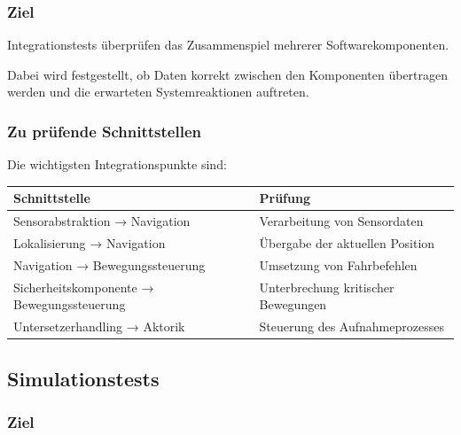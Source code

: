 \subsubsection{Ziel}\label{ziel-1}

Integrationstests überprüfen das Zusammenspiel mehrerer
Softwarekomponenten.

Dabei wird festgestellt, ob Daten korrekt zwischen den Komponenten
übertragen werden und die erwarteten Systemreaktionen auftreten.

\subsubsection{Zu prüfende
Schnittstellen}\label{zu-pruxfcfende-schnittstellen}

Die wichtigsten Integrationspunkte sind:

\begin{longtable}[]{@{}
  >{\raggedright\arraybackslash}p{}
  >{\raggedright\arraybackslash}p{}@{}}
\toprule\noalign{}
\begin{minipage}[b]{\linewidth}\raggedright
Schnittstelle
\end{minipage} & \begin{minipage}[b]{\linewidth}\raggedright
Prüfung
\end{minipage} \\
\midrule\noalign{}
\endhead
\bottomrule\noalign{}
\endlastfoot
Sensorabstraktion → Navigation & Verarbeitung von Sensordaten \\
Lokalisierung → Navigation & Übergabe der aktuellen Position \\
Navigation → Bewegungssteuerung & Umsetzung von Fahrbefehlen \\
Sicherheitskomponente → Bewegungssteuerung & Unterbrechung kritischer
Bewegungen \\
Untersetzerhandling → Aktorik & Steuerung des Aufnahmeprozesses \\
\end{longtable}

\subsection{Simulationstests}\label{simulationstests}

\subsubsection{Ziel}\label{ziel-2}

